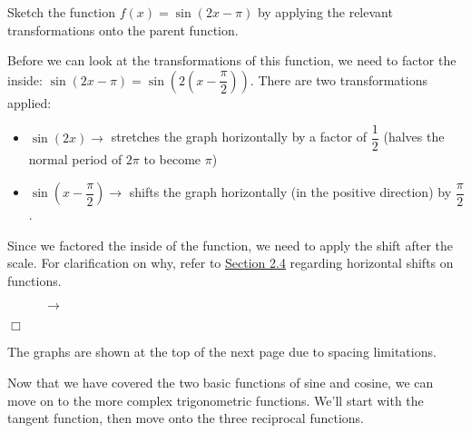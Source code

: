 \documentclass[../book.tex]{subfiles}
\begin{document}
\begin{example}
Sketch the function $f(x)=\sin(2x-\pi)$ by applying the relevant transformations onto the parent function.
\end{example}
\begin{solution}
Before we can look at the transformations of this function, we need to factor the inside: $\sin\left(2x-\pi\right)=\sin\left(2\left(x-\dfrac{\pi}{2}\right)\right)$. There are two transformations applied:\begin{itemize}
    \item $\sin(2x)\longrightarrow$ stretches the graph horizontally by a factor of $\dfrac{1}{2}$ (halves the normal period of $2\pi$ to become $\pi$)
    \item $\sin\left(x-\dfrac{\pi}{2}\right) \longrightarrow$ shifts the graph horizontally (in the positive direction) by $\dfrac{\pi}{2}$.
\end{itemize}
Since we factored the inside of the function, we need to apply the shift after the scale.  For clarification on why, refer to \hyperlink{section.2.4}{Section 2.4} regarding horizontal shifts on functions.
\begin{figure}[!ht]
    \centering
      $\to$ 
\end{figure} $\Box$
\end{solution}
\begin{remark}
The graphs are shown at the top of the next page due to spacing limitations.
\end{remark}
Now that we have covered the two basic functions of sine and cosine, we can move on to the more complex trigonometric functions. We'll start with the tangent function, then move onto the three reciprocal functions.
\end{document}
